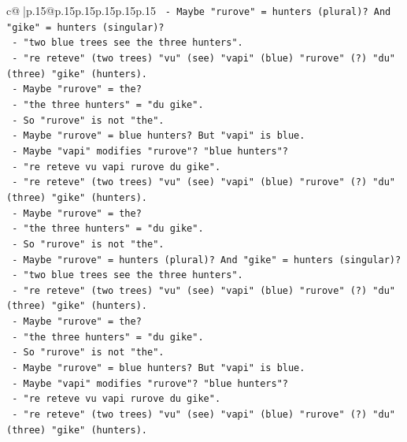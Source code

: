 \documentclass{article}
\begin{document}
{\begin{supertabular}{c@{$\;$}|p{.15\linewidth}@{}p{.15\linewidth}p{.15\linewidth}p{.15\linewidth}p{.15\linewidth}p{.15\linewidth}}
{{{\texttt{           {-} Maybe "rurove" = hunters (plural)? And "gike" = hunters (singular)?} \\
\texttt{           {-} "two blue trees see the three hunters".} \\
\texttt{           {-} "re reteve" (two trees) "vu" (see) "vapi" (blue) "rurove" (?) "du" (three) "gike" (hunters).} \\
\texttt{           {-} Maybe "rurove" = the?} \\
\texttt{           {-} "the three hunters" = "du gike".} \\
\texttt{           {-} So "rurove" is not "the".} \\
\texttt{           {-} Maybe "rurove" = blue hunters? But "vapi" is blue.} \\
\texttt{           {-} Maybe "vapi" modifies "rurove"? "blue hunters"?} \\
\texttt{           {-} "re reteve vu vapi rurove du gike".} \\
\texttt{           {-} "re reteve" (two trees) "vu" (see) "vapi" (blue) "rurove" (?) "du" (three) "gike" (hunters).} \\
\texttt{           {-} Maybe "rurove" = the?} \\
\texttt{           {-} "the three hunters" = "du gike".} \\
\texttt{           {-} So "rurove" is not "the".} \\
\texttt{           {-} Maybe "rurove" = hunters (plural)? And "gike" = hunters (singular)?} \\
\texttt{           {-} "two blue trees see the three hunters".} \\
\texttt{           {-} "re reteve" (two trees) "vu" (see) "vapi" (blue) "rurove" (?) "du" (three) "gike" (hunters).} \\
\texttt{           {-} Maybe "rurove" = the?} \\
\texttt{           {-} "the three hunters" = "du gike".} \\
\texttt{           {-} So "rurove" is not "the".} \\
\texttt{           {-} Maybe "rurove" = blue hunters? But "vapi" is blue.} \\
\texttt{           {-} Maybe "vapi" modifies "rurove"? "blue hunters"?} \\
\texttt{           {-} "re reteve vu vapi rurove du gike".} \\
\texttt{           {-} "re reteve" (two trees) "vu" (see) "vapi" (blue) "rurove" (?) "du" (three) "gike" (hunters).} \\
}}}
\end{supertabular}}
\end{document}
